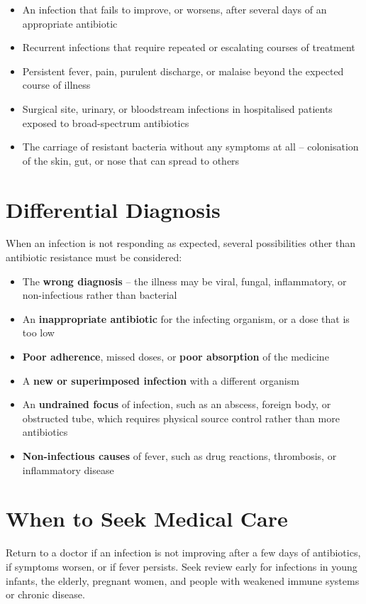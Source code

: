 \begin{itemize}
    \item An infection that fails to improve, or worsens, after several days of an appropriate antibiotic
    \item Recurrent infections that require repeated or escalating courses of treatment
    \item Persistent fever, pain, purulent discharge, or malaise beyond the expected course of illness
    \item Surgical site, urinary, or bloodstream infections in hospitalised patients exposed to broad-spectrum antibiotics
    \item The carriage of resistant bacteria without any symptoms at all -- colonisation of the skin, gut, or nose that can spread to others
\end{itemize}

\section*{Differential Diagnosis}
When an infection is not responding as expected, several possibilities other than antibiotic resistance must be considered:

\begin{itemize}
    \item The \textbf{wrong diagnosis} -- the illness may be viral, fungal, inflammatory, or non-infectious rather than bacterial
    \item An \textbf{inappropriate antibiotic} for the infecting organism, or a dose that is too low
    \item \textbf{Poor adherence}, missed doses, or \textbf{poor absorption} of the medicine
    \item A \textbf{new or superimposed infection} with a different organism
    \item An \textbf{undrained focus} of infection, such as an abscess, foreign body, or obstructed tube, which requires physical source control rather than more antibiotics
    \item \textbf{Non-infectious causes} of fever, such as drug reactions, thrombosis, or inflammatory disease
\end{itemize}

\section*{When to Seek Medical Care}
Return to a doctor if an infection is not improving after a few days of antibiotics, if symptoms worsen, or if fever persists. Seek review early for infections in young infants, the elderly, pregnant women, and people with weakened immune systems or chronic disease.

